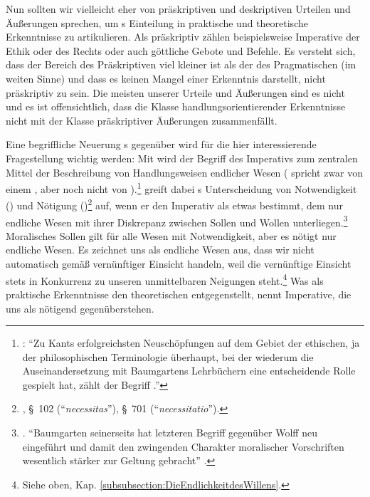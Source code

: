 Nun sollten wir vielleicht eher von präskriptiven und deskriptiven Urteilen
und Äußerungen sprechen, um s Einteilung in praktische und
theoretische Erkenntnisse zu artikulieren. Als präskriptiv zählen beispielsweise
Imperative der Ethik oder des Rechts oder auch göttliche Gebote und Befehle. Es versteht sich,
dass der Bereich des Präskriptiven viel kleiner ist als der des Pragmatischen
(im weiten Sinne) und dass es keinen Mangel einer Erkenntnis darstellt, nicht
präskriptiv zu sein. Die meisten unserer Urteile und Äußerungen sind es nicht
und es ist offensichtlich, dass die Klasse handlungsorientierender Erkenntnisse
nicht mit der Klasse präskriptiver Äußerungen zusammenfällt.

Eine begriffliche Neuerung s gegenüber
 wird für die hier interessierende
Fragestellung wichtig werden: Mit  wird der Begriff des
Imperativs zum zentralen Mittel der Beschreibung von Handlungsweisen endlicher
Wesen ( spricht zwar von einem
, aber noch nicht von
).\footnote{\cite[Vgl.][164]{Schwaiger:KategorischeundandereImperative1999}:
\enquote{Zu Kants erfolgreichsten Neuschöpfungen auf dem Gebiet der ethischen,
ja der philosophischen Terminologie überhaupt, bei der wiederum die
Auseinandersetzung mit Baumgartens Lehrbüchern eine entscheidende Rolle gespielt
hat, zählt der Begriff .}}  greift
dabei s Unterscheidung von
Notwendigkeit () und Nötigung
()\footnote{\cite[Vgl.][]{Baumgarten:Metaphysica---Metaphysik2011},
\S~102 (\enquote{\emph{necessitas}}),
\S~701 (\enquote{\emph{necessitatio}}).} auf, wenn er den Imperativ als etwas
bestimmt, dem nur endliche Wesen mit ihrer Diskrepanz zwischen Sollen und Wollen
unterliegen.\footnote{\cite[Vgl.][164--167]{Schwaiger:KategorischeundandereImperative1999}.
\enquote{Baumgarten seinerseits hat letzteren Begriff gegenüber Wolff neu
eingeführt und damit den zwingenden Charakter moralischer Vorschriften
wesentlich stärker zur Geltung gebracht}
\parencite[][167]{Schwaiger:KategorischeundandereImperative1999}.} Moralisches
Sollen gilt für alle Wesen mit Notwendigkeit, aber es nötigt nur endliche Wesen.
Es zeichnet uns als endliche Wesen aus, dass wir nicht automatisch gemäß
vernünftiger Einsicht handeln, weil die vernünftige Einsicht stets in Konkurrenz
zu unseren unmittelbaren Neigungen steht.\footnote{Siehe oben, Kap.
\ref{subsubsection:DieEndlichkeitdesWillens}.} Was
 als praktische Erkenntnisse den
theoretischen entgegenstellt, nennt  Imperative, die uns
als nötigend gegenüberstehen.

